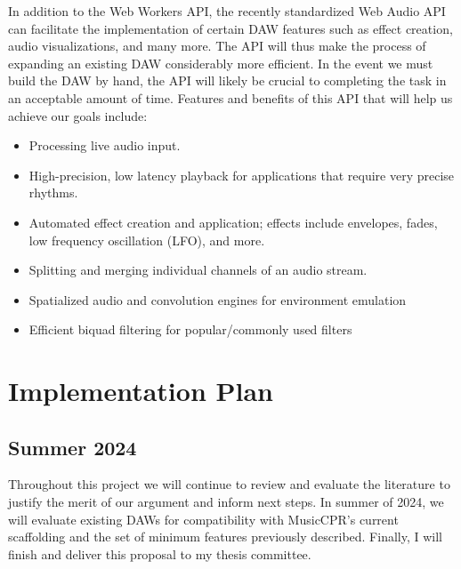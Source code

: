 \documentclass[manuscript,screen,review]{acmart}
\begin{document}
In addition to the Web Workers API, the recently standardized Web Audio API can facilitate the implementation of certain DAW features such as effect creation, audio visualizations, and many more.
The API will thus make the process of expanding an existing DAW considerably more efficient.
In the event we must build the DAW by hand, the API will likely be crucial to completing the task in an acceptable amount of time. Features and benefits of this API that will help us achieve our goals include:

\begin{itemize}
    \item Processing live audio input.
    \item High-precision, low latency playback for applications that require very precise rhythms.
    \item Automated effect creation and application; effects include envelopes, fades, low frequency oscillation (LFO), and more.
    \item Splitting and merging individual channels of an audio stream.
    \item Spatialized audio and convolution engines for environment emulation
    \item Efficient biquad filtering for popular/commonly used filters
\end{itemize}

\newpage

\section{Implementation Plan}
\subsection{Summer 2024}
Throughout this project we will continue to review and evaluate the literature to justify the merit of our argument and inform next steps.
In summer of 2024, we will evaluate existing DAWs for compatibility with MusicCPR's current scaffolding and the set of minimum features previously described.
Finally, I will finish and deliver this proposal to my thesis committee.
\end{document}
